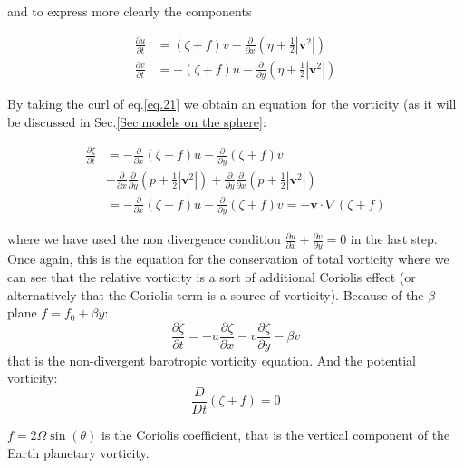 and to express more clearly the components

\[\begin{aligned}
		\frac{\partial u}{\partial t} & = (\zeta +f) v -\frac{\partial }{\partial x}(\eta+\frac{1}{2}|\mathbf{v}^2|)  \\
		\frac{\partial v}{\partial t} & = -(\zeta +f) u -\frac{\partial }{\partial y}(\eta+\frac{1}{2}|\mathbf{v}^2|)
	\end{aligned}\]

By taking the curl of eq.\ref{eq.21} we obtain an equation for the vorticity (as it will be discussed in Sec.\ref{Sec:models on the sphere}:

\[\begin{aligned}
		\frac{\partial \zeta}{\partial t} & = -\frac{\partial }{\partial x}(\zeta +f) u -\frac{\partial }{\partial y}(\zeta +f) v                                                                                          \\
		                                  & -\frac{\partial }{\partial x} \frac{\partial }{\partial y}(p+\frac{1}{2}|\mathbf{v}^2|) +\frac{\partial }{\partial y}\frac{\partial }{\partial x}(p+\frac{1}{2}|\mathbf{v}^2|) \\
		                                  & =  -\frac{\partial }{\partial x}(\zeta +f) u -\frac{\partial }{\partial y}(\zeta +f) v = -\mathbf{v}\cdot\nabla(\zeta +f)
	\end{aligned}\]

where we have used the non divergence condition
\(\frac{\partial u}{\partial x}+\frac{\partial v}{\partial y}=0\) in the
last step. Once again, this is the equation for the conservation of
total vorticity where we can see that the relative vorticity is a sort
of additional Coriolis effect (or alternatively that the Coriolis term
is a source of vorticity). Because of the $\beta$-plane $f=f_0+\beta y$:
\begin{equation}\label{Barotropic equation}
	\frac{\partial\zeta}{\partial t}=-u\frac{\partial\zeta}{\partial x}-v\frac{\partial\zeta}{\partial y}-\beta v
\end{equation}
that is the non-divergent barotropic vorticity equation. And the potential vorticity:
\begin{equation}\label{eq.potential vorticity}
	\frac{D}{Dt}(\zeta +f)=0
\end{equation}

\(f= 2\Omega \sin(\theta)\) is the Coriolis coefficient, that is the
vertical component of the Earth planetary vorticity.

